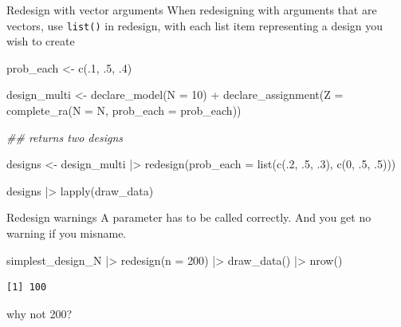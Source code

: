 \documentclass[
  11pt,
  ignorenonframetext,
]{beamer}
\newenvironment{Shaded}{\begin{snugshade}}{\end{snugshade}}
\newcommand{\AttributeTok}[1]{\textcolor[rgb]{0.40,0.45,0.13}{#1}}
\newcommand{\DecValTok}[1]{\textcolor[rgb]{0.68,0.00,0.00}{#1}}
\newcommand{\DocumentationTok}[1]{\textcolor[rgb]{0.37,0.37,0.37}{\textit{#1}}}
\newcommand{\FunctionTok}[1]{\textcolor[rgb]{0.28,0.35,0.67}{#1}}
\newcommand{\NormalTok}[1]{\textcolor[rgb]{0.00,0.23,0.31}{#1}}
\newcommand{\OtherTok}[1]{\textcolor[rgb]{0.00,0.23,0.31}{#1}}
\newcommand{\SpecialCharTok}[1]{\textcolor[rgb]{0.37,0.37,0.37}{#1}}
\begin{document}
\begin{frame}[fragile]{Redesign with vector arguments}
\protect\hypertarget{redesign-with-vector-arguments}{}
When redesigning with arguments that are vectors, use \texttt{list()} in
redesign, with each list item representing a design you wish to create

\begin{Shaded}
\begin{Highlighting}[]
\NormalTok{prob\_each }\OtherTok{\textless{}{-}} \FunctionTok{c}\NormalTok{(.}\DecValTok{1}\NormalTok{, .}\DecValTok{5}\NormalTok{, .}\DecValTok{4}\NormalTok{)}

\NormalTok{design\_multi  }\OtherTok{\textless{}{-}} 
  \FunctionTok{declare\_model}\NormalTok{(}\AttributeTok{N =} \DecValTok{10}\NormalTok{) }\SpecialCharTok{+}
  \FunctionTok{declare\_assignment}\NormalTok{(}\AttributeTok{Z =} \FunctionTok{complete\_ra}\NormalTok{(}\AttributeTok{N =}\NormalTok{ N, }\AttributeTok{prob\_each =}\NormalTok{ prob\_each))}

\DocumentationTok{\#\# returns two designs}

\NormalTok{designs }\OtherTok{\textless{}{-}}\NormalTok{ design\_multi }\SpecialCharTok{|\textgreater{}} \FunctionTok{redesign}\NormalTok{(}\AttributeTok{prob\_each =} \FunctionTok{list}\NormalTok{(}\FunctionTok{c}\NormalTok{(.}\DecValTok{2}\NormalTok{, .}\DecValTok{5}\NormalTok{, .}\DecValTok{3}\NormalTok{), }\FunctionTok{c}\NormalTok{(}\DecValTok{0}\NormalTok{, .}\DecValTok{5}\NormalTok{, .}\DecValTok{5}\NormalTok{)))}
  
\NormalTok{designs }\SpecialCharTok{|\textgreater{}} \FunctionTok{lapply}\NormalTok{(draw\_data)}
\end{Highlighting}
\end{Shaded}
\end{frame}

\begin{frame}[fragile]{Redesign warnings}
\protect\hypertarget{redesign-warnings}{}
A parameter has to be called correctly. And you get no warning if you
misname.

\begin{Shaded}
\begin{Highlighting}[]
\NormalTok{simplest\_design\_N  }\SpecialCharTok{|\textgreater{}} \FunctionTok{redesign}\NormalTok{(}\AttributeTok{n =} \DecValTok{200}\NormalTok{) }\SpecialCharTok{|\textgreater{}} \FunctionTok{draw\_data}\NormalTok{() }\SpecialCharTok{|\textgreater{}} \FunctionTok{nrow}\NormalTok{()}
\end{Highlighting}
\end{Shaded}

\begin{verbatim}
[1] 100
\end{verbatim}

why not 200?
\end{frame}
\end{document}
